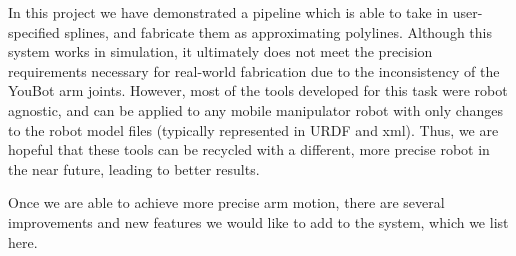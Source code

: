 \documentclass[conference]{acmsiggraph}
\begin{document}
In this project we have demonstrated a pipeline which is able to take in user-specified splines, and fabricate them as approximating polylines.  Although this system works in simulation, it ultimately does not meet the precision requirements necessary for real-world fabrication due to the inconsistency of the YouBot arm joints.  However, most of the tools developed for this task were robot agnostic, and can be applied to any mobile manipulator robot with only changes to the robot model files (typically represented in URDF and xml).  Thus, we are hopeful that these tools can be recycled with a different, more precise robot in the near future, leading to better results.

Once we are able to achieve more precise arm motion, there are several improvements and new features we would like to add to the system, which we list here.
\end{document}
